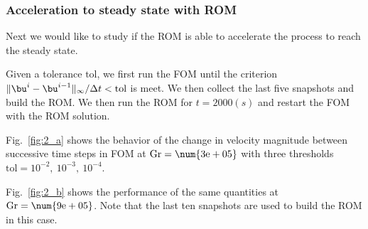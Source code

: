\subsubsection{Acceleration to steady state with ROM}
Next we would like to study if the ROM is able to accelerate the process to
reach the steady state.  

Given a tolerance $\text{tol}$, we first run the FOM until the criterion
$\|\bu^i - \bu^{i-1}\|_\infty / \Delta t < \text{tol}$ is meet. We then collect
the last five snapshots and build the ROM. We then run the ROM for $t=2000(s)$
and restart the FOM with the ROM solution.

Fig.~\ref{fig:2_a} shows the behavior of the change in velocity magnitude between
successive time steps in FOM at $\rm Gr=\num{3e+05}$ with three thresholds
$\text{tol}=10^{-2},~10^{-3},~10^{-4}$.  

Fig.~\ref{fig:2_b} shows the performance of the same quantities at $\rm
Gr=\num{9e+05}$. Note that the last ten snapshots are used to build the ROM in
this case.

